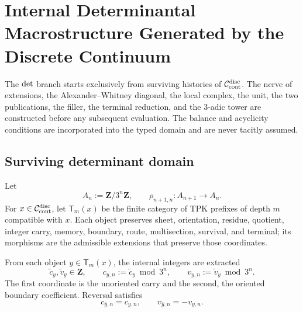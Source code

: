 \iffalse
\chapter[Internal Determinantal Macrostructure]{Internal Determinantal Macrostructure Generated by the Discrete Continuum}
\label{chap:detint-macroestructura}

\begin{thesisbox}
The \({\rm det}\) branch starts exclusively from surviving histories of
\(\mathcal C_{\rm cont}^{\rm disc}\). The nerve of extensions, the Alexander--Whitney diagonal,
the local complex, the unit, the two publications, the filler, the terminal
reduction, and the \(3\)-adic tower are constructed before any subsequent
evaluation. The balance and acyclicity conditions are incorporated into the
typed domain and are never tacitly assumed.
\end{thesisbox}

\section{Surviving determinant domain}

Let
\begin{equation}\label{eq:detint-an}
 A_n:=\mathbf Z/3^n\mathbf Z,
 \qquad
 \rho_{n+1,n}:A_{n+1}\longrightarrow A_n.
\end{equation}
For \(x\in\mathcal C_{\rm cont}^{\rm disc}\), let
\(\mathsf T_m(x)\) be the finite category of TPK prefixes of depth \(m\)
compatible with \(x\). Each object preserves sheet, orientation, residue,
quotient, integer carry, memory, boundary, route, multisection, survival,
and terminal; its morphisms are the admissible extensions that preserve those
coordinates.

From each object \(y\in\mathsf T_m(x)\), the internal integers are extracted
\begin{equation}\label{eq:detint-c-v-lifts}
 \widetilde c_y,\widetilde v_y\in\mathbf Z,
 \qquad
 c_{y,n}:=\widetilde c_y\bmod3^n,
 \qquad
 v_{y,n}:=\widetilde v_y\bmod3^n.
\end{equation}
The first coordinate is the unoriented carry and the second, the oriented
boundary coefficient. Reversal satisfies
\begin{equation}\label{eq:detint-or-cv}
 c_{\bar y,n}=c_{y,n},
 \qquad
 v_{\bar y,n}=-v_{y,n}.
\end{equation}

